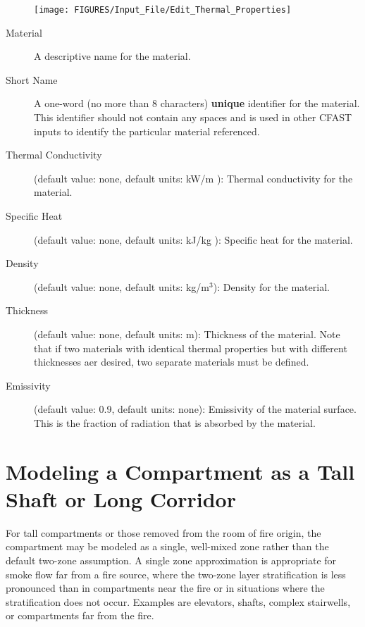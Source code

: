 \begin{figure}[h!]
\begin{center}
\texttt{[image: FIGURES/Input\_File/Edit\_Thermal\_Properties]}
\end{center}
\end{figure}

\begin{description}
\item[Material] A descriptive name for the material.

\item[Short Name] A one-word (no more than 8 characters) \textbf{unique} identifier for the material.  This identifier should not contain any spaces and is used in other CFAST inputs to identify the particular material referenced.

\item[Thermal Conductivity] (default value: none, default units: kW/m \degc): Thermal conductivity for the material.

\item[Specific Heat] (default value: none, default units: kJ/kg \degc): Specific heat for the material.

\item[Density] (default value: none, default units: kg/m$^3$): Density for the material.

\item[Thickness] (default value: none, default units: m): Thickness of the material.  Note that if two materials with identical thermal properties but with different thicknesses aer desired, two separate materials must be defined.

\item[Emissivity] (default value: 0.9, default units: none): Emissivity of the material surface.  This is the fraction of radiation that is absorbed by the material.
\end{description}


\section{Modeling a Compartment as a Tall Shaft or Long Corridor}

For tall compartments or those removed from the room of fire origin, the compartment may be modeled as a single, well-mixed zone rather than the default two-zone assumption. A single zone approximation is appropriate for smoke flow far from a fire source, where the two-zone layer stratification is less pronounced than in compartments near the fire or in situations where the stratification does not occur. Examples are elevators, shafts, complex stairwells, or compartments far from the fire.

